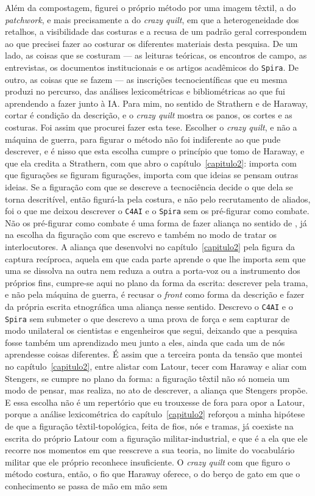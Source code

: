 Além da compostagem, figurei o próprio método por uma imagem têxtil, a do \textit{patchwork}, e mais precisamente a do \textit{crazy quilt}, em que a heterogeneidade dos retalhos, a visibilidade das costuras e a recusa de um padrão geral correspondem ao que precisei fazer ao costurar os diferentes materiais desta pesquisa. De um lado, as coisas que se costuram --- as leituras teóricas, os encontros de campo, as entrevistas, os documentos institucionais e os artigos acadêmicos do \texttt{Spira}. De outro, as coisas que se fazem --- as inscrições tecnocientíficas que eu mesma produzi no percurso, das análises lexicométricas e bibliométricas ao que fui aprendendo a fazer junto à IA. Para mim, no sentido de Strathern e de Haraway, cortar é condição da descrição, e o \textit{crazy quilt} mostra os panos, os cortes e as costuras. Foi assim que procurei fazer esta tese. Escolher o \textit{crazy quilt}, e não a máquina de guerra, para figurar o método não foi indiferente ao que pude descrever, e é nisso que esta escolha cumpre o princípio que tomo de Haraway, e que ela credita a Strathern, com que abro o capítulo~\ref{capitulo2}: importa com que figurações se figuram figurações, importa com que ideias se pensam outras ideias. Se a figuração com que se descreve a tecnociência decide o que dela se torna descritível, então figurá-la pela costura, e não pelo recrutamento de aliados, foi o que me deixou descrever o \texttt{C4AI} e o \texttt{Spira} sem os pré-figurar como combate. Não os pré-figurar como combate é uma forma de fazer aliança no sentido de \textcite{stengers2018another}, já na escolha da figuração com que escrevo e também no modo de tratar os interlocutores. A aliança que desenvolvi no capítulo~\ref{capitulo2} pela figura da captura recíproca, aquela em que cada parte aprende o que lhe importa sem que uma se dissolva na outra nem reduza a outra a porta-voz ou a instrumento dos próprios fins, cumpre-se aqui no plano da forma da escrita: descrever pela trama, e não pela máquina de guerra, é recusar o \textit{front} como forma da descrição e fazer da própria escrita etnográfica uma aliança nesse sentido. Descrevo o \texttt{C4AI} e o \texttt{Spira} sem submeter o que descrevo a uma prova de força e sem capturar de modo unilateral os cientistas e engenheiros que segui, deixando que a pesquisa fosse também um aprendizado meu junto a eles, ainda que cada um de nós aprendesse coisas diferentes. É assim que a terceira ponta da tensão que montei no capítulo~\ref{capitulo2}, entre alistar com Latour, tecer com Haraway e aliar com Stengers, se cumpre no plano da forma: a figuração têxtil não só nomeia um modo de pensar, mas realiza, no ato de descrever, a aliança que Stengers propõe. E essa escolha não é um repertório que eu trouxesse de fora para opor a Latour, porque a análise lexicométrica do capítulo~\ref{capitulo2} reforçou a minha hipótese de que a figuração têxtil-topológica, feita de fios, nós e tramas, já coexiste na escrita do próprio Latour com a figuração militar-industrial, e que é a ela que ele recorre nos momentos em que reescreve a sua teoria, no limite do vocabulário militar que ele próprio reconhece insuficiente. O \textit{crazy quilt} com que figuro o método costura, então, o fio que Haraway oferece, o do berço de gato em que o conhecimento se passa de mão em mão sem 